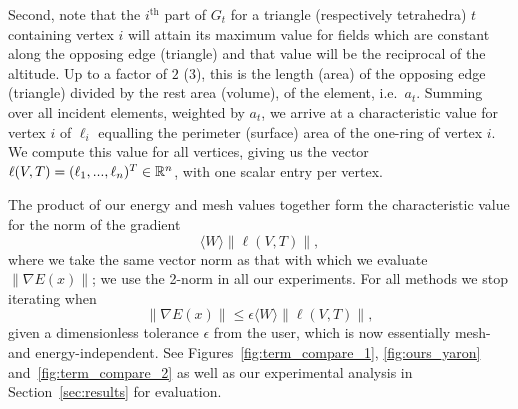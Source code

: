 Second, note that the $i^\textrm{th}$ part of $G_t$ for a triangle
(respectively tetrahedra) $t$ containing vertex $i$ will attain its
maximum value for fields which are constant along the opposing edge
(triangle) and that value will be the reciprocal of the altitude.
Up to a factor of $2$ ($3$), this is the length (area) of the
opposing edge (triangle) divided by the rest area (volume), of the
element, i.e.\ $a_t$. Summing over all incident elements, weighted
by $a_t$, we arrive at a characteristic value for vertex $i$ of
$\ell_i$ equalling the perimeter (surface) area of the one-ring of
vertex $i$. We compute this value for all vertices, giving us the
vector $\ell(V,T) = (\ell_1, ..., \ell_n)^T \in \mathbb{R}^n$, with one
scalar entry per vertex.

The product of our energy and mesh values together form the characteristic value for the norm of the gradient
\begin{equation}
    \langle W \rangle \| \ell(V,T) \|,
\end{equation}
where we take the same vector norm as that with which we evaluate $\|\nabla E(x)\|$; we use the 2-norm in all our
experiments. For all methods we stop iterating when
\begin{equation}
    \|\nabla E(x)\| \leq \epsilon \langle W \rangle \| \ell(V,T) \|,
\end{equation}
given a dimensionless tolerance $\epsilon$ from the user, which is
now essentially mesh- and energy-independent. See Figures\
\ref{fig:term_compare_1}, \ref{fig:ours_yaron} and\ \ref{fig:term_compare_2} as
well as our experimental analysis in Section\ \ref{sec:results} for evaluation.

